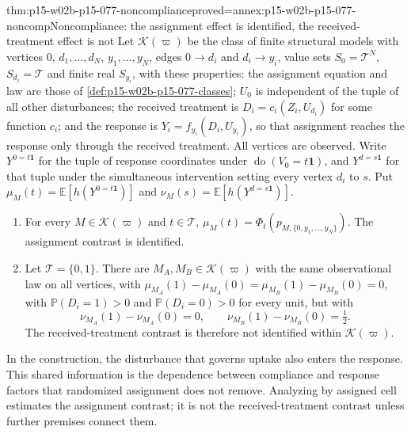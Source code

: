 \begin{hbtheorem}{thm:p15-w02b-p15-077-noncompliance}{proved=annex:p15-w02b-p15-077-noncomp}{Noncompliance: the assignment effect is identified, the received-treatment effect is not}
Let \(\mathcal K(\varpi)\) be the class of finite structural models with
vertices \(0\), \(d_1,\ldots,d_N\), \(y_1,\ldots,y_N\), edges
\(0\to d_i\) and \(d_i\to y_i\), value sets \(S_0=\mathcal T^N\),
\(S_{d_i}=\mathcal T\) and finite real \(S_{y_i}\), with these properties:
the assignment equation and law are those of
\cref{def:p15-w02b-p15-077-classes}; \(U_0\) is independent of the tuple
of all other disturbances; the received treatment is
\(D_i=c_i(Z_i,U_{d_i})\) for some function \(c_i\); and the response is
\(Y_i=f_{y_i}(D_i,U_{y_i})\), so that assignment reaches the response only
through the received treatment. All vertices are observed. Write \(Y^{0=t\mathbf 1}\) for the tuple of
response coordinates under \(\operatorname{do}(V_0=t\mathbf 1)\), and
\(Y^{d=s\mathbf 1}\) for that tuple under the simultaneous intervention
setting every vertex \(d_i\) to \(s\). Put
\(\mu_M(t)=\mathbb E[h(Y^{0=t\mathbf 1})]\) and
\(\nu_M(s)=\mathbb E[h(Y^{d=s\mathbf 1})]\).
\begin{enumerate}
\item For every \(M\in\mathcal K(\varpi)\) and \(t\in\mathcal T\),
      \(\mu_M(t)=\Phi_t(p_{M,\{0,y_1,\ldots,y_N\}})\). The assignment
      contrast is identified.
\item Let \(\mathcal T=\{0,1\}\). There are \(M_A,M_B\in\mathcal K(\varpi)\)
      with the same observational law on all vertices, with
      \(\mu_{M_A}(1)-\mu_{M_A}(0)=\mu_{M_B}(1)-\mu_{M_B}(0)=0\), with
      \(\mathbb P(D_i=1)>0\) and \(\mathbb P(D_i=0)>0\) for every
      unit, but with
      \[
       \nu_{M_A}(1)-\nu_{M_A}(0)=0,\qquad
       \nu_{M_B}(1)-\nu_{M_B}(0)=\tfrac12.
      \]
      The received-treatment contrast is therefore not identified within
      \(\mathcal K(\varpi)\).
\end{enumerate}
\end{hbtheorem}

In the construction, the disturbance that governs uptake also enters the
response. This shared information is the dependence between compliance and
response factors that randomized assignment does not remove. Analyzing
by assigned cell estimates the assignment contrast; it is not the
received-treatment contrast unless further premises connect them.

